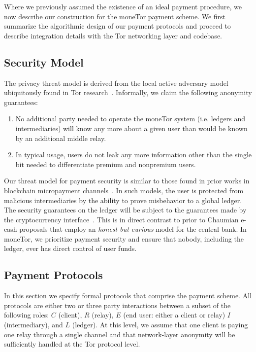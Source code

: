 Where we previously assumed the existence of an ideal payment procedure, we now
describe our construction for the moneTor payment scheme. We first summarize the
algorithmic design of our payment protocols and proceed to describe integration
details with the Tor networking layer and codebase.

\subsection{Security Model}

The privacy threat model is derived from the local active adversary
model ubiquitously found in Tor research~\cite{dingledine2004tor}. Informally, we claim the following
anonymity guarantees:

\begin{enumerate}
\item No additional party needed to operate the moneTor system (i.e. ledgers
  and intermediaries) will know any more about a given user than would be known
  by an additional middle relay.
\item In typical usage, users do not leak any more information other than the
  single bit needed to differentiate premium and nonpremium users.
\end{enumerate}

Our threat model for payment security is similar to those found in prior works
in blockchain micropayment channels~\cite{poon2016bitcoin}. In such models, the
user is protected from malicious intermediaries by the ability to prove
misbehavior to a global ledger. The security guarantees on the ledger will be
subject to the guarantees made by the cryptocurrency
interface~\cite{back2014enabling, poon2017plasma}. This is in direct contrast to
prior to Chaumian e-cash proposals that employ an \emph{honest but curious}
model for the central bank. In moneTor, we prioritize payment security and
ensure that nobody, including the ledger, ever has direct control of user funds.

\subsection{Payment Protocols}

In this section we specify formal protocols that comprise the payment
scheme. All protocols are either two or three party interactions between a
subset of the following roles: $C$ (client), $R$ (relay), $E$ (end user: either
a client or relay) $I$ (intermediary), and $L$ (ledger). At this level, we
assume that one client is paying one relay through a single channel and that
network-layer anonymity will be sufficiently handled at the Tor protocol level.

